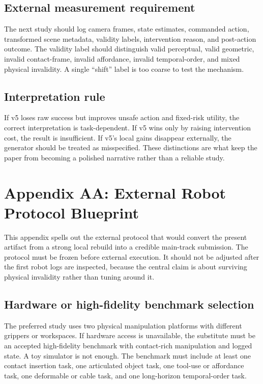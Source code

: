 \documentclass{article}
\begin{document}
\subsection{External measurement requirement}
The next study should log camera frames, state estimates, commanded action, transformed scene metadata, validity labels, intervention reason, and post-action outcome. The validity label should distinguish valid perceptual, valid geometric, invalid contact-frame, invalid affordance, invalid temporal-order, and mixed physical invalidity. A single ``shift'' label is too coarse to test the mechanism.

\subsection{Interpretation rule}
If v5 loses raw success but improves unsafe action and fixed-risk utility, the correct interpretation is task-dependent. If v5 wins only by raising intervention cost, the result is insufficient. If v5's local gains disappear externally, the generator should be treated as misspecified. These distinctions are what keep the paper from becoming a polished narrative rather than a reliable study.


\section{Appendix AA: External Robot Protocol Blueprint}
This appendix spells out the external protocol that would convert the present artifact from a strong local rebuild into a credible main-track submission. The protocol must be frozen before external execution. It should not be adjusted after the first robot logs are inspected, because the central claim is about surviving physical invalidity rather than tuning around it.

\subsection{Hardware or high-fidelity benchmark selection}
The preferred study uses two physical manipulation platforms with different grippers or workspaces. If hardware access is unavailable, the substitute must be an accepted high-fidelity benchmark with contact-rich manipulation and logged state. A toy simulator is not enough. The benchmark must include at least one contact insertion task, one articulated object task, one tool-use or affordance task, one deformable or cable task, and one long-horizon temporal-order task.
\end{document}
